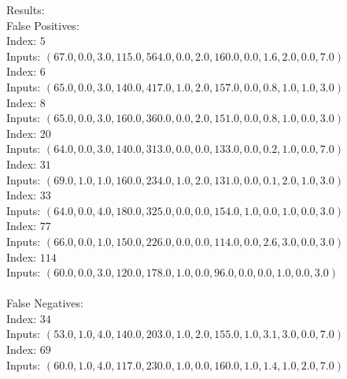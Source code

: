 \begin{enumerate}
\begin{enumerate}
					Results: \\
					\textnormal{False Positives: } \\
					\textnormal{Index: } \( 5 \) \\
					\textnormal{Inputs: } \( (67.0, 0.0, 3.0, 115.0, 564.0, 0.0, 2.0, 160.0, 0.0, 1.6, 2.0, 0.0, 7.0) \) \\
					\textnormal{Index: } \( 6 \) \\
					\textnormal{Inputs: } \( (65.0, 0.0, 3.0, 140.0, 417.0, 1.0, 2.0, 157.0, 0.0, 0.8, 1.0, 1.0, 3.0) \) \\
					\textnormal{Index: } \( 8 \) \\
					\textnormal{Inputs: } \( (65.0, 0.0, 3.0, 160.0, 360.0, 0.0, 2.0, 151.0, 0.0, 0.8, 1.0, 0.0, 3.0) \) \\
					\textnormal{Index: } \( 20 \) \\
					\textnormal{Inputs: } \( (64.0, 0.0, 3.0, 140.0, 313.0, 0.0, 0.0, 133.0, 0.0, 0.2, 1.0, 0.0, 7.0) \) \\
					\textnormal{Index: } \( 31 \) \\
					\textnormal{Inputs: } \( (69.0, 1.0, 1.0, 160.0, 234.0, 1.0, 2.0, 131.0, 0.0, 0.1, 2.0, 1.0, 3.0) \) \\
					\textnormal{Index: } \( 33 \) \\
					\textnormal{Inputs: } \( (64.0, 0.0, 4.0, 180.0, 325.0, 0.0, 0.0, 154.0, 1.0, 0.0, 1.0, 0.0, 3.0) \) \\
					\textnormal{Index: } \( 77 \) \\
					\textnormal{Inputs: } \( (66.0, 0.0, 1.0, 150.0, 226.0, 0.0, 0.0, 114.0, 0.0, 2.6, 3.0, 0.0, 3.0) \) \\
					\textnormal{Index: } \( 114 \) \\
					\textnormal{Inputs: } \( (60.0, 0.0, 3.0, 120.0, 178.0, 1.0, 0.0, 96.0, 0.0, 0.0, 1.0, 0.0, 3.0) \) \\ \\
					\textnormal{False Negatives: } \\
					\textnormal{Index: } \( 34 \) \\
					\textnormal{Inputs: } \( (53.0, 1.0, 4.0, 140.0, 203.0, 1.0, 2.0, 155.0, 1.0, 3.1, 3.0, 0.0, 7.0) \) \\
					\textnormal{Index: } \( 69 \) \\
					\textnormal{Inputs: } \( (60.0, 1.0, 4.0, 117.0, 230.0, 1.0, 0.0, 160.0, 1.0, 1.4, 1.0, 2.0, 7.0) \) \\ \\
										

\end{enumerate}
\end{enumerate}
